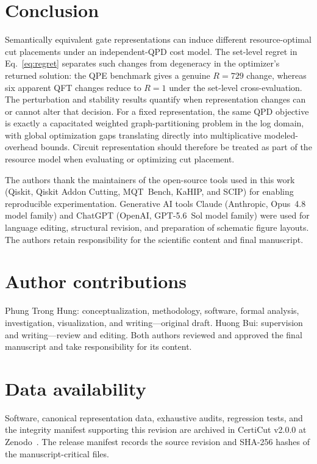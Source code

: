 \documentclass[
  aps,
  pra,
  reprint,
  amsmath,
  amssymb,
  longbibliography,
  nofootinbib,
  floatfix
]{revtex4-2}
\theoremstyle{plain}
\begin{document}
\section{Conclusion}
\label{sec:conclusion}

Semantically equivalent gate representations can induce different resource-optimal cut placements under an independent-QPD cost model. The set-level regret in Eq.~\eqref{eq:regret} separates such changes from degeneracy in the optimizer's returned solution: the QPE benchmark gives a genuine $R=729$ change, whereas six apparent QFT changes reduce to $R=1$ under the set-level cross-evaluation. The perturbation and stability results quantify when representation changes can or cannot alter that decision. For a fixed representation, the same QPD objective is exactly a capacitated weighted graph-partitioning problem in the log domain, with global optimization gaps translating directly into multiplicative modeled-overhead bounds. Circuit representation should therefore be treated as part of the resource model when evaluating or optimizing cut placement.

\begin{acknowledgments}
The authors thank the maintainers of the open-source tools used in this work (Qiskit, Qiskit Addon Cutting, MQT~Bench, KaHIP, and SCIP) for enabling reproducible experimentation. Generative AI tools Claude (Anthropic, Opus~4.8 model family) and ChatGPT (OpenAI, GPT-5.6~Sol model family) were used for language editing, structural revision, and preparation of schematic figure layouts. The authors retain responsibility for the scientific content and final manuscript.
\end{acknowledgments}

\section*{Author contributions}
Phung Trong Hung: conceptualization, methodology, software, formal analysis, investigation, visualization, and writing---original draft. Huong Bui: supervision and writing---review and editing. Both authors reviewed and approved the final manuscript and take responsibility for its content.

\section*{Data availability}
Software, canonical representation data, exhaustive audits, regression tests, and the integrity manifest supporting this revision are archived in CertiCut v2.0.0 at Zenodo~\cite{certicut_zenodo}. The release manifest records the source revision and SHA-256 hashes of the manuscript-critical files.
\end{document}
